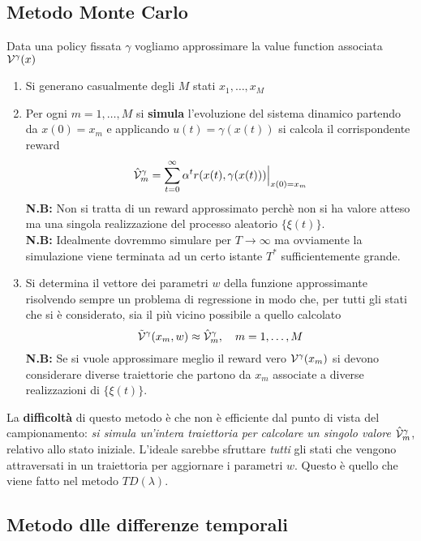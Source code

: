 \subsection{Metodo Monte Carlo}
Data una policy fissata $\gamma$ vogliamo approssimare la value function associata $\mathcal{V}^\gamma(x)$
\begin{enumerate}
\item Si generano casualmente degli $M$ stati $x_1, \dots, x_M$
\item Per ogni $m =1, \dots, M$ si \textbf{simula} l'evoluzione del sistema dinamico partendo da $x(0) = x_m$ e applicando $u(t) = \gamma(x(t))$ si calcola il corrispondente reward
    \begin{equation}
    \hat{\mathcal{V}}^\gamma_m = \sum_{t=0}^\infty \alpha^t r(x(t), \gamma(x(t))) \Big |_{x(0)=x_m}
    \end{equation} \textbf{N.B:} Non si tratta di un reward approssimato perch\`e non si ha valore atteso ma una singola realizzazione del processo aleatorio $\{\xi(t) \}$.\\
    \textbf{N.B:} Idealmente dovremmo simulare per $T \to \infty$ ma ovviamente la simulazione viene terminata ad un certo istante $T^*$ sufficientemente grande.
\item Si determina il vettore dei parametri $w$ della funzione approssimante risolvendo sempre un problema di regressione in modo che, per tutti gli stati che si \`e considerato, sia il pi\`u vicino possibile a quello calcolato
    \begin{equation}
    \tilde{\mathcal{V}}^\gamma(x_m, w) \approx \hat{\mathcal{V}}^\gamma_m, \quad m=1,\dots,M
    \end{equation} \textbf{N.B:} Se si vuole approssimare meglio il reward vero $\mathcal{V}^\gamma(x_m)$ si devono considerare diverse traiettorie che partono da $x_m$ associate a diverse realizzazioni di $\{\xi(t)\}$.
\end{enumerate}
La \textbf{difficolt\`a} di questo metodo \`e che non \`e efficiente dal punto di vista del campionamento: \textit{si simula un'intera traiettoria per calcolare un singolo valore} $\hat{\mathcal{V}}^\gamma_m$, relativo allo stato iniziale. L'ideale sarebbe sfruttare \textit{tutti} gli stati che vengono attraversati in un traiettoria per aggiornare i parametri $w$. Questo \`e quello che viene fatto nel metodo $TD(\lambda)$.

\subsection{Metodo dlle differenze temporali}

